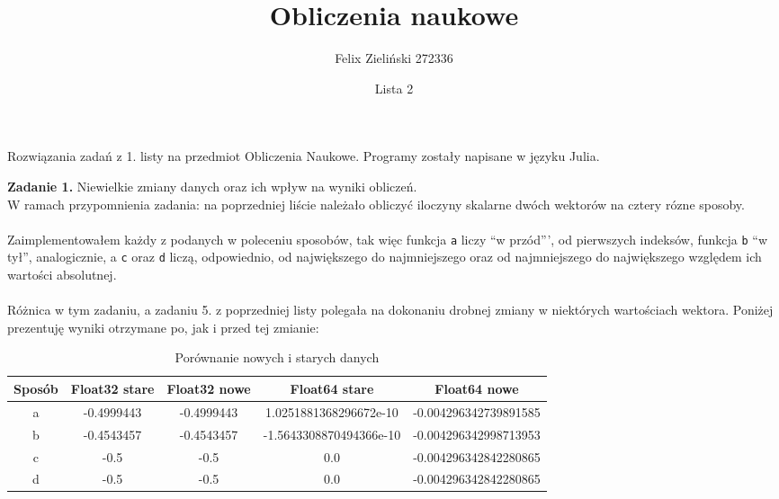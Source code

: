 \documentclass[15pt, a4paper]{article}
\title{Obliczenia naukowe}
\author{Felix Zieliński 272336}
\date{Lista 2}
\begin{document}
\maketitle

\noindent Rozwiązania zadań z 1. listy na przedmiot Obliczenia Naukowe. Programy zostały napisane w języku Julia. 

\vspace{0.5cm}

\noindent\hrulefill


\vspace{0.5cm}

\noindent\textbf{Zadanie 1.} Niewielkie zmiany danych oraz ich wpływ na wyniki obliczeń.\\

\noindent W ramach przypomnienia zadania: na poprzedniej liście  należało obliczyć iloczyny skalarne dwóch wektorów na cztery rózne sposoby.\\\\
Zaimplementowałem każdy z podanych w poleceniu sposobów, tak więc funkcja \verb|a| liczy "`w przód"'', od pierwszych indeksów, funkcja \verb|b| "`w tył"', analogicznie, a \verb|c| oraz \verb|d| liczą, odpowiednio, od największego do najmniejszego oraz od najmniejszego do największego względem ich wartości absolutnej.\\\\
Różnica w tym zadaniu, a zadaniu 5. z poprzedniej listy polegała na dokonaniu drobnej zmiany w niektórych wartościach wektora. Poniżej prezentuję wyniki otrzymane po, jak i przed tej zmianie:

\begin{table}[ht]
    \begin{adjustbox}{max width=\textwidth}
    \begin{tabular}{|c|c|c|c|c|}
        \hline 
        Sposób & Float32 stare & Float32 nowe & Float64 stare & Float64 nowe \\ \hline
        a & -0.4999443 & -0.4999443 & 1.0251881368296672e-10 & -0.004296342739891585 \\ \hline
        b & -0.4543457 & -0.4543457 & -1.5643308870494366e-10 & -0.004296342998713953 \\ \hline
        c & -0.5 & -0.5 & 0.0 & -0.004296342842280865 \\ \hline
        d & -0.5 & -0.5 & 0.0 & -0.004296342842280865 \\ \hline
    \end{tabular}
    \end{adjustbox}
    \caption{Porównanie nowych i starych danych}
    \label{tab:products}
\end{table}
\end{document}
